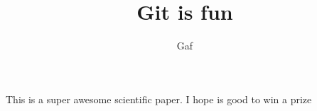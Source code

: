 \documentclass[10pt]{article}
\author{Gaf}
\title{Git is fun}
\begin{document}
  \maketitle

   This is a super awesome scientific paper.
I hope is good to win a prize
\end{document}
